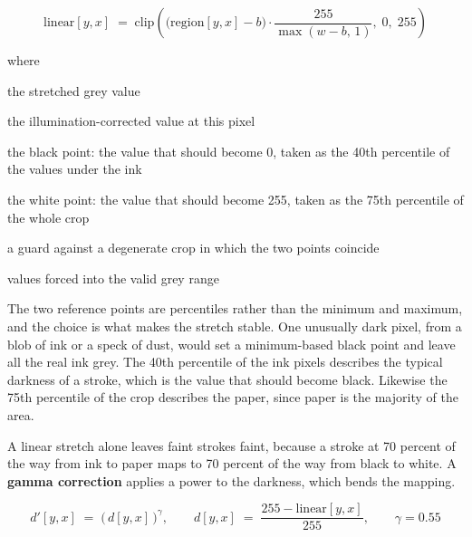 \begin{equation}
\mathrm{linear}[y,x] \;=\; \mathrm{clip}\!\left(\big(\mathrm{region}[y,x] - b\big)\cdot\frac{255}{\max(w - b,\,1)},\; 0,\; 255\right)
\end{equation}

\noindent where
\begin{description}[leftmargin=2.4em,style=nextline,font=\normalfont\ttfamily]\setlength\itemsep{1pt}
  \item[{$\mathrm{linear}[y,x]$}] \normalfont the stretched grey value
  \item[{$\mathrm{region}[y,x]$}] \normalfont the illumination-corrected value at this pixel
  \item[{$b$}] \normalfont the black point: the value that should become 0, taken as the 40th percentile of the values under the ink
  \item[{$w$}] \normalfont the white point: the value that should become 255, taken as the 75th percentile of the whole crop
  \item[{$\max(w-b,\,1)$}] \normalfont a guard against a degenerate crop in which the two points coincide
  \item[{$\mathrm{clip}(\cdot,0,255)$}] \normalfont values forced into the valid grey range
\end{description}
The two reference points are percentiles rather than the minimum and maximum, and the choice is what makes the stretch stable. One unusually dark pixel, from a blob of ink or a speck of dust, would set a minimum-based black point and leave all the real ink grey. The 40th percentile of the ink pixels describes the typical darkness of a stroke, which is the value that should become black. Likewise the 75th percentile of the crop describes the paper, since paper is the majority of the area.


A linear stretch alone leaves faint strokes faint, because a stroke at 70 percent of the way from ink to paper maps to 70 percent of the way from black to white. A \textbf{gamma correction} applies a power to the darkness, which bends the mapping.


\begin{equation}
d'[y,x] \;=\; \Big(\,d[y,x]\,\Big)^{\gamma}, \qquad d[y,x] \;=\; \frac{255 - \mathrm{linear}[y,x]}{255}, \qquad \gamma = 0.55
\end{equation}

